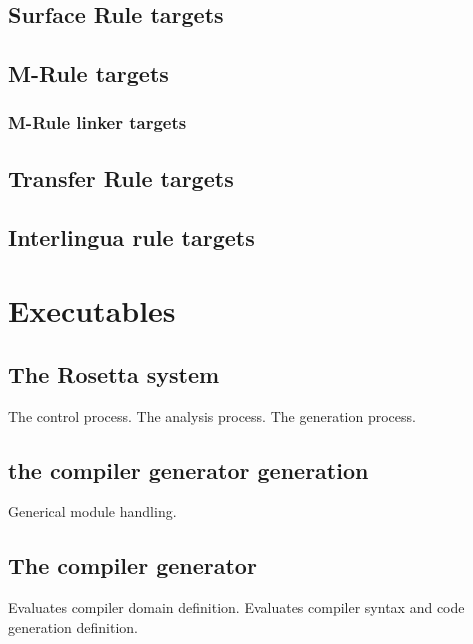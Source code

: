 \subsection{Surface Rule targets}
\bsc
{}
\esc
\subsection{M-Rule targets}
\bsc
{}
\esc
\subsubsection{M-Rule linker targets}
\bsc
{}
\esc

\subsection{Transfer Rule targets}
\bsc
{}
\esc
\subsection{Interlingua rule targets}
\bsc
{}
\esc

\newpage
\section{Executables}
\subsection{The Rosetta system}
\bsc
{} The control process.
 The analysis process.
 The generation process.
\esc
\subsection{the compiler generator generation}
\bsc
{} Generical module handling.
\esc
\subsection{The compiler generator}
\bsc
{} Evaluates compiler domain definition.
 Evaluates compiler syntax and code generation definition.
\esc
